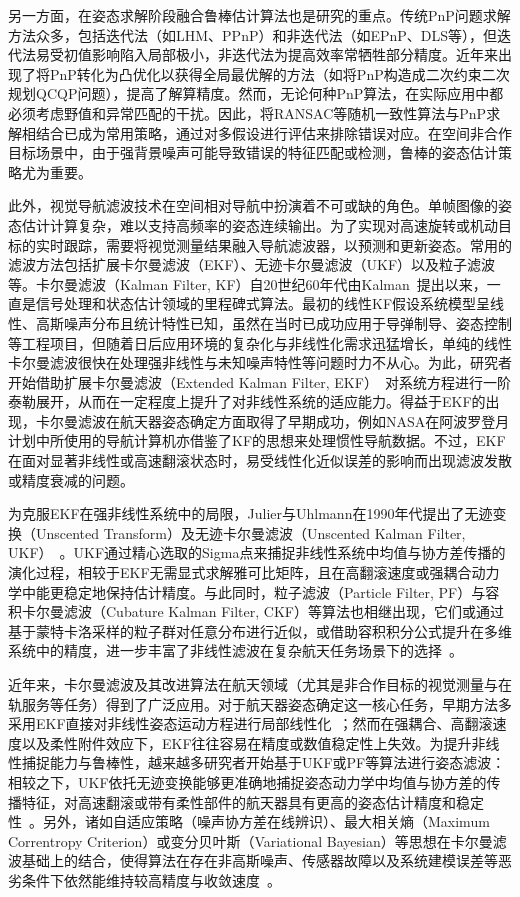 另一方面，在姿态求解阶段融合鲁棒估计算法也是研究的重点。传统PnP问题求解方法众多，包括迭代法（如LHM、PPnP）和非迭代法（如EPnP、DLS等），但迭代法易受初值影响陷入局部极小，非迭代法为提高效率常牺牲部分精度。近年来出现了将PnP转化为凸优化以获得全局最优解的方法（如将PnP构造成二次约束二次规划QCQP问题），提高了解算精度。然而，无论何种PnP算法，在实际应用中都必须考虑野值和异常匹配的干扰。因此，将RANSAC等随机一致性算法与PnP求解相结合已成为常用策略，通过对多假设进行评估来排除错误对应。在空间非合作目标场景中，由于强背景噪声可能导致错误的特征匹配或检测，鲁棒的姿态估计策略尤为重要。

此外，视觉导航滤波技术在空间相对导航中扮演着不可或缺的角色。单帧图像的姿态估计计算复杂，难以支持高频率的姿态连续输出。为了实现对高速旋转或机动目标的实时跟踪，需要将视觉测量结果融入导航滤波器，以预测和更新姿态。常用的滤波方法包括扩展卡尔曼滤波（EKF）、无迹卡尔曼滤波（UKF）以及粒子滤波等。卡尔曼滤波（Kalman Filter, KF）自20世纪60年代由Kalman~\cite{kalman1960new}提出以来，一直是信号处理和状态估计领域的里程碑式算法。最初的线性KF假设系统模型呈线性、高斯噪声分布且统计特性已知，虽然在当时已成功应用于导弹制导、姿态控制等工程项目，但随着日后应用环境的复杂化与非线性化需求迅猛增长，单纯的线性卡尔曼滤波很快在处理强非线性与未知噪声特性等问题时力不从心。为此，研究者开始借助扩展卡尔曼滤波（Extended Kalman Filter, EKF）~\cite{jazwinski2007stochastic}对系统方程进行一阶泰勒展开，从而在一定程度上提升了对非线性系统的适应能力。得益于EKF的出现，卡尔曼滤波在航天器姿态确定方面取得了早期成功，例如NASA在阿波罗登月计划中所使用的导航计算机亦借鉴了KF的思想来处理惯性导航数据。不过，EKF在面对显著非线性或高速翻滚状态时，易受线性化近似误差的影响而出现滤波发散或精度衰减的问题。

为克服EKF在强非线性系统中的局限，Julier与Uhlmann在1990年代提出了无迹变换（Unscented Transform）及无迹卡尔曼滤波（Unscented Kalman Filter, UKF）~\cite{Julier1997}。UKF通过精心选取的Sigma点来捕捉非线性系统中均值与协方差传播的演化过程，相较于EKF无需显式求解雅可比矩阵，且在高翻滚速度或强耦合动力学中能更稳定地保持估计精度。与此同时，粒子滤波（Particle Filter, PF）与容积卡尔曼滤波（Cubature Kalman Filter, CKF）等算法也相继出现，它们或通过基于蒙特卡洛采样的粒子群对任意分布进行近似，或借助容积积分公式提升在多维系统中的精度，进一步丰富了非线性滤波在复杂航天任务场景下的选择~\cite{9272767,AMCCKF_2023}。

近年来，卡尔曼滤波及其改进算法在航天领域（尤其是非合作目标的视觉测量与在轨服务等任务）得到了广泛应用。对于航天器姿态确定这一核心任务，早期方法多采用EKF直接对非线性姿态运动方程进行局部线性化~\cite{Lefferts1982,Shuster1981}；然而在强耦合、高翻滚速度以及柔性附件效应下，EKF往往容易在精度或数值稳定性上失效。为提升非线性捕捉能力与鲁棒性，越来越多研究者开始基于UKF或PF等算法进行姿态滤波：相较之下，UKF依托无迹变换能够更准确地捕捉姿态动力学中均值与协方差的传播特征，对高速翻滚或带有柔性部件的航天器具有更高的姿态估计精度和稳定性~\cite{NJHK202201006,1024861534.nh}。另外，诸如自适应策略（噪声协方差在线辨识）、最大相关熵（Maximum Correntropy Criterion）或变分贝叶斯（Variational Bayesian）等思想在卡尔曼滤波基础上的结合，使得算法在存在非高斯噪声、传感器故障以及系统建模误差等恶劣条件下依然能维持较高精度与收敛速度~\cite{GXJM202103017,9272767,qiu2023novel,POURTAKDOUST2022134}。

